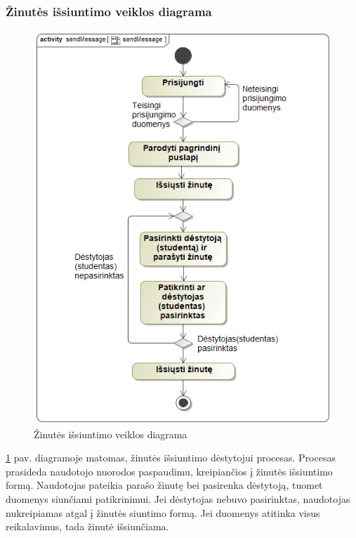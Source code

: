 \documentclass{VUMIFPSkursinis}
\begin{document}
\subsubsection{Žinutės išsiuntimo veiklos diagrama}
\begin{figure}[H]
	\centering
	\includegraphics[scale=0.65]{img/sendMessage.jpg}
	\caption{Žinutės išsiuntimo veiklos diagrama}
	\label{fig:sendMessage}
\end{figure}
\ref{fig:sendMessage} pav. diagramoje matomas, žinutės išsiuntimo dėstytojui procesas. Procesas prasideda naudotojo
nuorodos paspaudimu, kreipiančios į žinutės išsiuntimo formą. Naudotojas pateikia parašo žinutę bei pasirenka dėstytoją, tuomet duomenys siunčiami patikrinimui. Jei dėstytojas nebuvo pasirinktas, naudotojas nukreipiamas
atgal į žinutės siuntimo formą. Jei duomenys atitinka visus reikalavimus, tada žinutė išsiunčiama.
\end{document}

